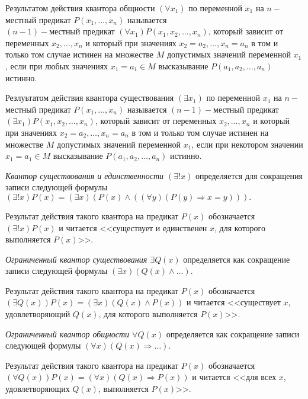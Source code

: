 \begin{definition}
    Результатом действия квантора общности $(\forall x_1)$ по переменной $x_1$ на $n-$местный предикат $P(x_1,\ldots,x_n)$ называется \\ $(n-1)-$местный предикат $(\forall x_1)P(x_1,x_2,\ldots,x_n)$, который зависит от переменных $x_2,\ldots,x_n$ и который при значениях $x_2=a_2,\ldots,x_n=a_n$ в том и только том случае истинен на множестве $M$ допустимых значений переменной $x_1$, если при любых значениях $x_1=a_1 \in M$ высказывание $P(a_1,a_2,\ldots,a_n)$ истинно.
\end{definition}

\begin{definition}
    Резлуьтатом действия квантора существования $(\exists x_1)$ по переменной $x_1$ на $n-$местный предикат $P(x_1,\ldots,x_n)$ называется $(n-1)-$местный предикат $(\exists x_1)P(x_1,x_2,\ldots,x_n)$, который зависит от переменных $x_2,\ldots,x_n$ и который при значениях $x_2=a_2,\ldots,x_n=a_n$ в том и только том случае истинен на множестве $M$ допустимых значений переменной $x_1$, если при некотором значении $x_1=a_1 \in M$ высказывание $P(a_1,a_2,\ldots,a_n)$ истинно.
\end{definition}

\begin{definition}
    \textit{Квантор существования и единственности $(\exists ! x)$} определяется для сокращения записи следующей формулы \\
    $(\exists ! x)P(x)=(\exists x)(P(x)\land ((\forall y)(P(y)\Rightarrow x = y))).$

    Результат действия такого квантора на предикат $P(x)$ обозначается $(\exists ! x)P(x)$ и читается <<существует и единственен $x$, для которого выполняется $P(x)$>>.
\end{definition}

\begin{definition}
    \textit{Ограниченный квантор существования $\exists Q(x)$} определяется как сокращение записи следующей формулы $(\exists x)(Q(x)\land\ldots)$.

    Результат действия такого квантора на предикат $P(x)$ обозначается $(\exists Q(x))P(x)=(\exists x)(Q(x)\land P(x))$ и читается <<существует $x$, удовлетворяющий $Q(x)$, для которого выполняется $P(x)$>>.
\end{definition}

\begin{definition}
    \textit{Ограниченный квантор общности $\forall Q(x)$} определяется как сокращение записи следующей формулы $(\forall x)(Q(x)\Rightarrow \ldots)$.

    Результат действия такого квантора на предикат $P(x)$ обозначается $(\forall Q(x))P(x) = (\forall x)(Q(x)\Rightarrow P(x))$ и читается <<для всех $x$, удовлетворяющих $Q(x)$, выполняется $P(x)$>>.
\end{definition}

